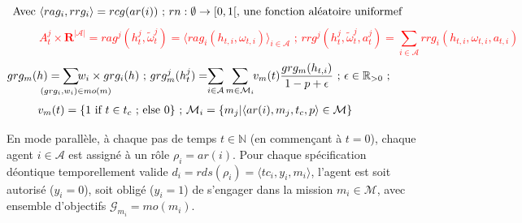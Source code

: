 \begin{figure}[h!]
\begin{scriptsize}
        \vspace{-0.2cm}
        \textcolor{red}{\[\hspace{-1cm}\text{ \hspace{-0.1cm} Avec } \langle rag_i, rrg_i \rangle = rcg(ar(i)) \text{ ; } rn: \emptyset \to [0,1[ \text{, une fonction aléatoire uniformef}\]}
        \vspace{-0.3cm}
        \textcolor{red}{\[A^j_t \times \mathbf{R}^{|\mathcal{A}|} = rag^j(h^j_t, \tilde{\omega}^j_t) = \langle rag_i(h_{t,i}, \omega_{t,i}) \rangle_{i \in \mathcal{A}} \text{ ; } rrg^j(h^j_t, \tilde{\omega}^j_t, a^j_t) = \sum_{i \in \mathcal{A}}{rrg_i(h_{t,i}, \omega_{t,i}, a_{t,i})}\]}
        \vspace{-0.75cm}
        \textcolor{blue}{
            \begin{gather*}
                \hspace{-1cm} grg_m(h) = \hspace{-1cm} \sum_{\hspace{0.3cm}(grg_i,w_i) \in mo(m)}{\hspace{-1.1cm} w_i \times grg_i(h)}
                \text{ ; }
                grg^j_m(h^j_t) = \hspace{-0.1cm} \sum_{i \in \mathcal{A}}{\sum_{m \in \mathcal{M}_i}{ \hspace{-0.1cm} v_m(t) \frac{grg_m(h_{t,i})}{1 - p + \epsilon} }} \text{ ; } \epsilon \in \mathbb{R}_{>0} \text{ ; }
            \end{gather*}
        }
        \vspace{-0.9cm}
        \textcolor{blue}{
            \begin{gather*}
                \hspace{-1cm}
                v_m(t) = \{ 1 \text{ if } t \in t_c \text{ ; else } 0 \} \text{ ; } \mathcal{M}_i = \{m_j | \langle ar(i),m_j,t_c,p \rangle \in \mathcal{M}\}
            \end{gather*}
        }
    \end{scriptsize}

\end{figure}

\noindent En mode parallèle, à chaque pas de temps $t \in \mathbb{N}$ (en commençant à $t=0$), chaque agent $i \in \mathcal{A}$ est assigné à un rôle $\rho_i = ar(i)$. Pour chaque spécification déontique temporellement valide $d_i = rds(\rho_i) = \langle tc_i, y_i, m_i \rangle$, l'agent est soit autorisé ($y_i = 0$), soit obligé ($y_i = 1$) de s'engager dans la mission $m_i \in \mathcal{M}$, avec ensemble d'objectifs $\mathcal{G}_{m_i} = mo(m_i)$.

